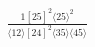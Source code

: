 \documentclass[varwidth, border=5pt]{standalone}
\begin{document}
\begin{my}
$\begin{gathered}
\scriptscriptstyle\frac{1[25]^2⟨25⟩^2}{⟨12⟩[24]^2⟨35⟩⟨45⟩}
\end{gathered}$
\end{my}
\end{document}

